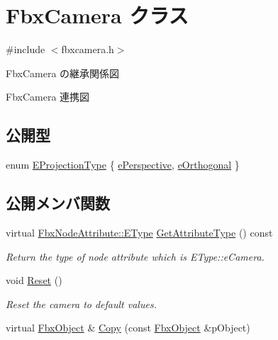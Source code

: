\hypertarget{class_fbx_camera}{}\section{Fbx\+Camera クラス}
\label{class_fbx_camera}


{\ttfamily \#include $<$fbxcamera.\+h$>$}



Fbx\+Camera の継承関係図


Fbx\+Camera 連携図
\subsection*{公開型}
\begin{DoxyCompactItemize}
\item 
enum \hyperlink{class_fbx_camera_a717b9b0d28c8b20c115edf8c80016fb1}{E\+Projection\+Type} \{ \hyperlink{class_fbx_camera_a717b9b0d28c8b20c115edf8c80016fb1aa0ea1fe68c0ac171dae64779456dec9d}{e\+Perspective}, 
\hyperlink{class_fbx_camera_a717b9b0d28c8b20c115edf8c80016fb1aa04cb9cfd8a05c0406da47338eb62d3d}{e\+Orthogonal}
 \}
\end{DoxyCompactItemize}
\subsection*{公開メンバ関数}
\begin{DoxyCompactItemize}
\item 
virtual \hyperlink{class_fbx_node_attribute_a08e1669d3d1a696910756ab17de56d6a}{Fbx\+Node\+Attribute\+::\+E\+Type} \hyperlink{class_fbx_camera_a1149e4b05fd079637fe8d2a66a5a7a17}{Get\+Attribute\+Type} () const
\begin{DoxyCompactList}\small\item\em Return the type of node attribute which is E\+Type\+::e\+Camera. \end{DoxyCompactList}\item 
void \hyperlink{class_fbx_camera_aeeb56513eefdfe4b8df54181cfa44321}{Reset} ()
\begin{DoxyCompactList}\small\item\em Reset the camera to default values. \end{DoxyCompactList}\item 
virtual \hyperlink{class_fbx_object}{Fbx\+Object} \& \hyperlink{class_fbx_camera_ad6641b4f04167df79531fe4843834895}{Copy} (const \hyperlink{class_fbx_object}{Fbx\+Object} \&p\+Object)
\end{DoxyCompactItemize}
